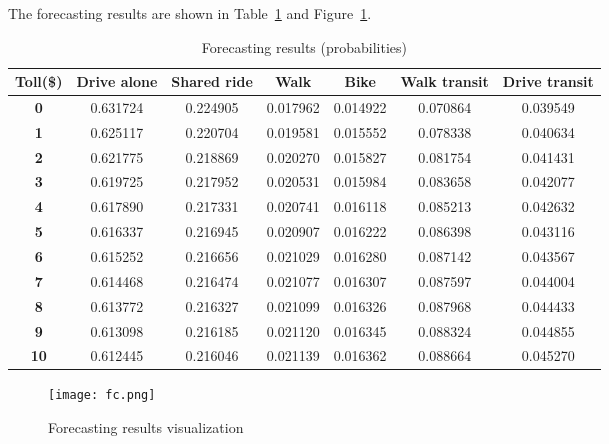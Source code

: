 \documentclass[11pt]{article}
\begin{document}
\subsubsection{}
The forecasting results are shown in Table~\ref{tb:fc} and Figure~\ref{fig:fc}.
\begin{table}[H]
	\centering
	\caption{\label{tb:fc}Forecasting results (probabilities)}
	\vspace{5pt}
	\begin{tabular}{|c|c|c|c|c|c|c|}      
		\hline                                                
		\textbf{Toll(\$)}  &  \textbf{Drive alone}  &  \textbf{Shared ride} &      \textbf{Walk} &      \textbf{Bike} &  \textbf{Walk transit} &  \textbf{Drive transit} \\\hline
		\textbf{0}       &     0.631724 &      0.224905 &  0.017962 &  0.014922 &      0.070864 &       0.039549 \\\hline
		\textbf{1}       &     0.625117 &      0.220704 &  0.019581 &  0.015552 &      0.078338 &       0.040634 \\\hline
		\textbf{2}       &     0.621775 &      0.218869 &  0.020270 &  0.015827 &      0.081754 &       0.041431 \\\hline
		\textbf{3}       &     0.619725 &      0.217952 &  0.020531 &  0.015984 &      0.083658 &       0.042077 \\\hline
		\textbf{4}       &     0.617890 &      0.217331 &  0.020741 &  0.016118 &      0.085213 &       0.042632 \\\hline
		\textbf{5}       &     0.616337 &      0.216945 &  0.020907 &  0.016222 &      0.086398 &       0.043116 \\\hline
		\textbf{6}       &     0.615252 &      0.216656 &  0.021029 &  0.016280 &      0.087142 &       0.043567 \\\hline
		\textbf{7}       &     0.614468 &      0.216474 &  0.021077 &  0.016307 &      0.087597 &       0.044004 \\\hline
		\textbf{8}       &     0.613772 &      0.216327 &  0.021099 &  0.016326 &      0.087968 &       0.044433 \\\hline
		\textbf{9}       &     0.613098 &      0.216185 &  0.021120 &  0.016345 &      0.088324 &       0.044855 \\\hline
		\textbf{10}      &     0.612445 &      0.216046 &  0.021139 &  0.016362 &      0.088664 &       0.045270 \\\hline
	\end{tabular}
\end{table}
\begin{figure}[H]
	\centering
	\texttt{[image: fc.png]}
	\caption{Forecasting results visualization}\label{fig:fc}	
\end{figure}
\end{document}
